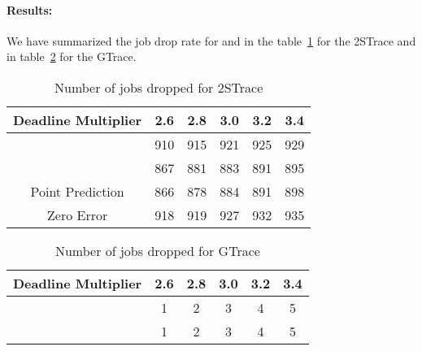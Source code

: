 {\paragraph{Results:} We have summarized the job drop rate for \slearn and
\primarybasepredict in the table~\ref{table:study2:jobsDropped:2STrace} for the
2STrace and in table~\ref{table:study2:jobsDropped:GTrace} for the GTrace.  
\begin{table}
  \caption{Number of jobs dropped for 2STrace}
\label{table:study2:jobsDropped:2STrace}
  \centering
      {\small
	\begin{tabular}{|c|c|c|c|c|c|}
	  \hline
		Deadline Multiplier&2.6& 2.8&3.0&3.2&3.4\\
	  \hline
		\slearn&910&915&921&925&929\\
	  \hline
		\primarybasepredict &867&881&883&891&895\\
	  \hline
		Point Prediction &866&878&884&891&898\\
	  \hline
		Zero Error &918&919&927&932&935\\
	  \hline
	\end{tabular}
      }
\vspace{-0.1in}
\end{table}
\begin{table}
  \caption{Number of jobs dropped for GTrace}
\label{table:study2:jobsDropped:GTrace}
  \centering
      {\small
	\begin{tabular}{|c|c|c|c|c|c|} 
	  \hline
		Deadline Multiplier&2.6& 2.8&3.0&3.2&3.4\\  
	  \hline
		\slearn&1&2&3&4&5\\
	  \hline
		\primarybasepredict &1&2&3&4&5\\
	  \hline
	\end{tabular}
      }
\vspace{-0.1in}
\end{table}
}
\fi


